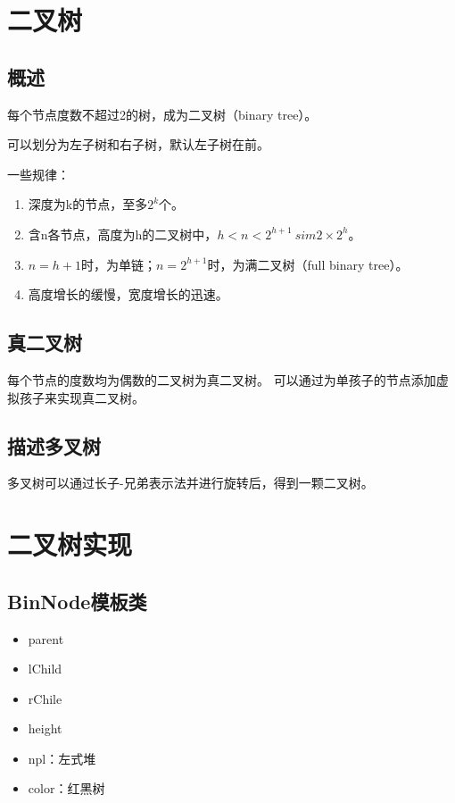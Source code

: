 \documentclass{article}
\begin{document}
\section{二叉树}
\subsection{概述}

每个节点度数不超过2的树，成为二叉树（binary tree）。

可以划分为左子树和右子树，默认左子树在前。

一些规律：
\begin{enumerate}
  \item 深度为k的节点，至多$2^k$个。
  \item 含n各节点，高度为h的二叉树中，$h<n<2^{h+1} \ sim 2 \times 2^h$。
  \item $n=h+1$时，为单链；$n=2^{h+1}$时，为满二叉树（full binary tree）。
  \item 高度增长的缓慢，宽度增长的迅速。
\end{enumerate}

\subsection{真二叉树}

每个节点的度数均为偶数的二叉树为真二叉树。
可以通过为单孩子的节点添加虚拟孩子来实现真二叉树。

\subsection{描述多叉树}

多叉树可以通过长子-兄弟表示法并进行旋转后，得到一颗二叉树。

\section{二叉树实现}
\subsection{BinNode模板类}
\begin{itemize}
  \item parent
  \item lChild
  \item rChile
  \item height
  \item npl：左式堆
  \item color：红黑树
\end{itemize}
\end{document}
